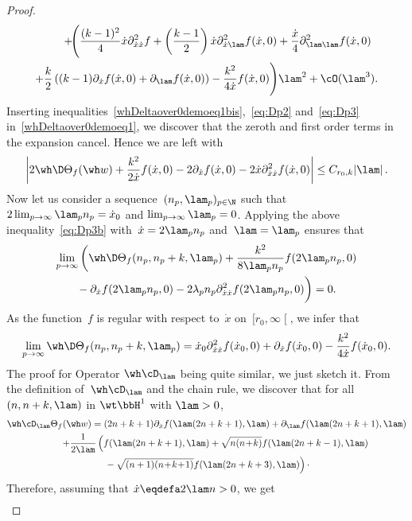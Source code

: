 \begin{proof}
\begin{multline}
\qquad+\!\Bigg(\frac{(k-1)^2}4\dot x\partial^2_{\dot x\dot x}f+\left(\frac{k-1}2\right)\dot x\partial^2_{\dot x\lam}f(\dot x,0) +\frac{\dot x}4\partial^2_{\lam\lam}f(\dot x,0)\\
+\frac k2\left((k-1)\partial_{\dot x}f(\dot x,0)+\partial_\lam f(\dot x,0)\right)-\frac{k^2}{4\dot x} f(\dot x,0)\Bigg)\lam^2+\cO(\lam^3).
\end{multline}
Inserting inequalities~\eqref{whDeltaover0demoeq1bis},~\eqref{eq:Dp2} and~\eqref{eq:Dp3} in~\eqref{whDeltaover0demoeq1}, we discover that the zeroth and first order terms in the expansion cancel. Hence we are left with
\begin{equation}\label{eq:Dp3b}
\left | 2\wh \D \Theta_f (\wh w) + \frac{k^2}{2\dot x}f(\dot x,0)-2\partial_{\dot x}f(\dot x,0)-2\dot x\partial^2_{\dot x\dot x}f(\dot x,0)\right | \leq C_{r_0,k} |\lam|\,.
\end{equation}
Now let us consider a sequence~$(n_p,\lam_p)_{p\in \N}$ such that~$2\lim_{p\rightarrow\infty} \lam_pn_p =\dot x_0$ and $\lim_{p\rightarrow\infty} \lam_p=0$. Applying the above inequality~\eqref{eq:Dp3b} with~$\dot x =2\lam_pn_p$ and~$\lam=\lam_p$ ensures that
\begin{multline*}
\lim_{p\rightarrow\infty} \bigg(\wh \D \Theta_f (n_p,n_p+k,\lam_p) + \frac{k^2}{8\lam_pn_p}f(2\lam_pn_p,0)\\
{} -\partial_{\dot x}f(2\lam_pn_p,0)-2\lambda_pn_p\partial^2_{\dot x\dot x}f(2\lam_pn_p,0)\bigg) =0.
\end{multline*}
As the function~$f$ is regular with respect to~$\dot x$ on~$[r_0,\infty\mathclose{[}$, we infer that
\[
\lim_{p\rightarrow\infty} \wh \D \Theta_f (n_p,n_p+k,\lam_p) = \dot x_0\partial^2_{\dot x\dot x}f(\dot x_0,0)+\partial_{\dot x}f(\dot x_0,0)-\frac{k^2}{4\dot x}f(\dot x_0,0).
\]
The proof for Operator $\wh\cD_\lam$ being quite similar, we just sketch it. From the definition of~$\wh\cD_\lam$ and the chain rule, we discover that for all $(n,n+k,\lam)$ in $\wt\bbH^1$ with $\lam>0$,
\begin{multline*}
\wh\cD_\lam\Theta_f(\wh w)=(2n+k+1)\partial_{\dot x}f(\lam(2n+k+1),\lam) +\partial_\lam f(\lam(2n+k+1),\lam)\\
\qquad +\frac1{2\lam}\left(f(\lam(2n+k+1),\lam)+\sqrt{n(n\!+\!k)}f(\lam(2n+k-1),\lam)\right.\\
\left.{} -\sqrt{(n+1)(n\!+\!k\!+\!1)}f(\lam(2n+k+3),\lam)\right)\cdotp
\end{multline*}
Therefore, assuming that $\dot x\eqdefa2\lam n>0$, we get
\begin{multline}

\end{multline}
\end{proof}
